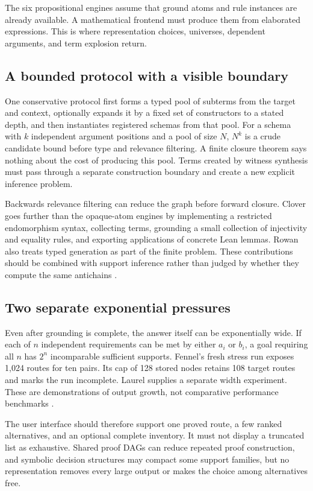 \documentclass[11pt,letterpaper]{article}
\theoremstyle{definition}\newtheorem{definition}[proposition]{Definition}
\theoremstyle{remark}\newtheorem{remark}[proposition]{Remark}
\begin{document}
The six propositional engines assume that ground atoms and rule instances
are already available. A mathematical frontend must produce them from
elaborated expressions. This is where representation choices, universes,
dependent arguments, and term explosion return.

\subsection{A bounded protocol with a visible boundary}

One conservative protocol first forms a typed pool of subterms from the
target and context, optionally expands it by a fixed set of constructors
to a stated depth, and then instantiates registered schemas from that pool.
For a schema with $k$ independent argument positions and a pool of size $N$,
$N^k$ is a crude candidate bound before type and relevance filtering. A
finite closure theorem says nothing about the cost of producing this pool.
Terms created by witness synthesis must pass through a separate construction
boundary and create a new explicit inference problem.

Backwards relevance filtering can reduce the graph before forward closure.
Clover goes further than the opaque-atom engines by implementing a restricted
endomorphism syntax, collecting terms, grounding a small collection of
injectivity and equality rules, and exporting applications of concrete Lean
lemmas. Rowan also treats typed generation as part of the finite problem.
These contributions should be combined with support inference rather than
judged by whether they compute the same antichains \cite{clover,rowan}.

\subsection{Two separate exponential pressures}

Even after grounding is complete, the answer itself can be exponentially
wide. If each of $n$ independent requirements can be met by either $a_i$ or
$b_i$, a goal requiring all $n$ has $2^n$ incomparable sufficient supports.
Fennel's fresh stress run exposes 1,024 routes for ten pairs. Its cap of 128
stored nodes retains 108 target routes and marks the run incomplete.
Laurel supplies a separate width experiment. These are demonstrations of
output growth, not comparative performance benchmarks \cite{fennel,laurel}.

The user interface should therefore support one proved route, a few ranked
alternatives, and an optional complete inventory. It must not display a
truncated list as exhaustive. Shared proof DAGs can reduce repeated proof
construction, and symbolic decision structures may compact some support
families, but no representation removes every large output or makes the
choice among alternatives free.
\end{document}
